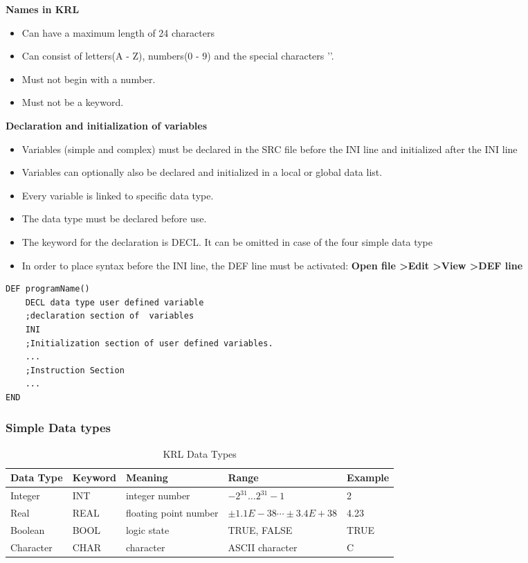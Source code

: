 \textbf{Names in KRL}
\begin{itemize}
	\item Can have a maximum length of 24 characters
	\item Can consist of letters(A - Z), numbers(0 - 9) and the special characters '\textdollar'.
	\item Must not begin with a number.
	\item Must not be a keyword.
\end{itemize}
\textbf{Declaration and initialization of variables}
\begin{itemize}
	\item Variables (simple and complex) must be declared in the SRC file before the INI line and initialized after the INI line
	\item Variables can optionally also be declared and initialized in a local or global data list. 
	\item Every variable is linked to specific data type.
	\item The data type must be declared before use.
	\item The keyword for the declaration is DECL. It can be omitted in case of the four simple data type	
	\item In order to place syntax before the INI line, the DEF line must be activated:
	\centering	\textbf{  Open file \textgreater Edit \textgreater View \textgreater DEF line}
\end{itemize}

\begin{lstlisting}[language=terCmd]
DEF programName()
    DECL data type user defined variable
    ;declaration section of  variables
    INI 
    ;Initialization section of user defined variables.
    ...
    ;Instruction Section
    ...
END
\end{lstlisting}

\subsubsection*{Simple Data types }
\begin{table}[h!]
	\centering
\begin{tabular}{|l|l|l|l|l|}\hline
\textbf{Data Type} & \textbf{Keyword} & \textbf{Meaning}               & \textbf{Range}                          & \textbf{Example} \\\hline\hline
Integer   & INT     & integer number        & $-2^31 … 2^31-1$               & 2       \\\hline
Real      & REAL    & floating point number & $\pm1.1E-38 \cdots \pm3.4E+38$ & 4.23    \\\hline
Boolean   & BOOL    & logic state           & TRUE, FALSE                    & TRUE    \\\hline
Character & CHAR    & character             & ASCII character                & C \\\hline
\end{tabular}
	\caption{KRL Data Types}
\label{table:1}
\end{table}
\newpage

